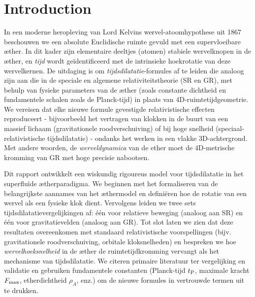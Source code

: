 
\section{Introduction}
In een moderne heropleving van Lord Kelvins wervel-atoomhypothese uit 1867~\cite{Kelvin1867-vortex} beschouwen we een absolute Euclidische ruimte gevuld met een supervloeibare æther. In dit kader zijn elementaire deeltjes (atomen) stabiele wervelknopen in de æther, en \emph{tijd} wordt geïdentificeerd met de intrinsieke hoekrotatie van deze wervelkernen. De uitdaging is om \emph{tijdsdilatatie}-formules af te leiden die analoog zijn aan die in de speciale en algemene relativiteitstheorie (SR en GR), met behulp van fysieke parameters van de æther (zoals constante dichtheid en fundamentele schalen zoals de Planck-tijd) in plaats van 4D-ruimtetijdgeometrie. We vereisen dat elke nieuwe formule gevestigde relativistische effecten reproduceert - bijvoorbeeld het vertragen van klokken in de buurt van een massief lichaam (gravitationele roodverschuiving) of bij hoge snelheid (speciaal-relativistische tijdsdilatatie) - ondanks het werken in een vlakke 3D-achtergrond. Met andere woorden, de \emph{werveldynamica} van de ether moet de 4D-metrische kromming van GR met hoge precisie nabootsen.

Dit rapport ontwikkelt een wiskundig rigoureus model voor tijdsdilatatie in het superfluïde ætherparadigma. We beginnen met het formaliseren van de belangrijkste aannames van het æthermodel en definiëren hoe de rotatie van een wervel als een fysieke klok dient. Vervolgens leiden we twee sets tijdsdilatatievergelijkingen af: één voor relatieve beweging (analoog aan SR) en één voor gravitatievelden (analoog aan GR). Tot slot laten we zien dat deze resultaten overeenkomen met standaard relativistische voorspellingen (bijv. gravitationele roodverschuiving, orbitale kloksnelheden) en bespreken we hoe \emph{wervelhoeksnelheid} in de æther de ruimtetijdkromming vervangt als het mechanisme van tijdsdilatatie. We citeren primaire literatuur ter vergelijking en validatie en gebruiken fundamentele constanten (Planck-tijd $t_{\rm P}$, maximale kracht $F_{\rm max}$, etherdichtheid $\rho_{\!A}$, enz.) om de nieuwe formules in vertrouwde termen uit te drukken.
